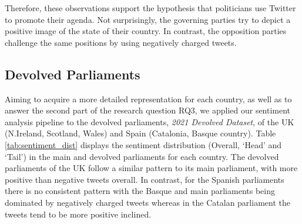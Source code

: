 Therefore, these observations support the hypothesis that politicians use Twitter to promote their agenda. %
Not surprisingly, the governing parties try to depict a positive image of the state of their country. In contrast, the opposition parties challenge the same positions by using negatively charged tweets.


\subsection{Devolved Parliaments}
\label{sec:devolved}

Aiming to acquire a more detailed representation for each country, as well as to answer the second part of the research question RQ3, we applied our sentiment analysis pipeline to the devolved parliaments, \textit{2021 Devolved Dataset}, of the UK (N.Ireland, Scotland, Wales) and Spain (Catalonia, Basque country). Table \ref{tab:sentiment_dist} displays the sentiment distribution (Overall, `Head' and `Tail') in the main and devolved parliaments for each country. The devolved parliaments of the UK follow a similar pattern to its main parliament, with more positive than negative tweets overall. In contrast, for the Spanish parliaments there is no consistent pattern with the Basque and main parliaments being dominated by negatively charged tweets whereas in the Catalan parliament the tweets tend to be more positive inclined. 



